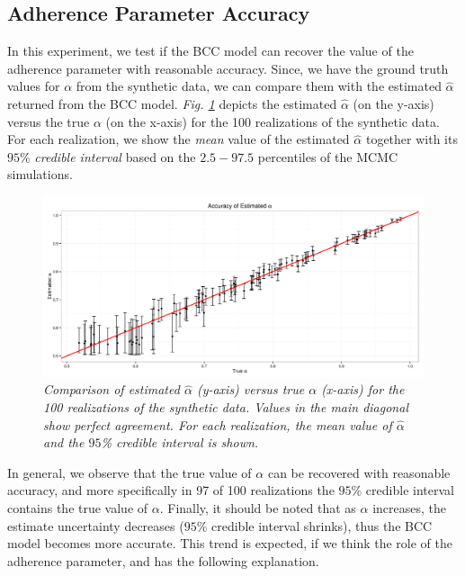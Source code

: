 \subsection{Adherence Parameter Accuracy } \label{integr-synth-alpha-sect}
In this experiment, we test if the BCC model can recover the value of the adherence parameter with reasonable accuracy. Since, we have the ground truth values for $\alpha$ from the synthetic data, we can compare them with the estimated $\hat{\alpha}$ returned from the BCC model. \emph{Fig. \ref{adherence-test-pic}} depicts the estimated $\hat{\alpha}$ (on the y-axis) versus the true $\alpha$ (on the x-axis) for the 100 realizations of the synthetic data. For each realization, we show the \emph{mean} value of the estimated $\hat{\alpha}$ together with its $95$\% \emph{credible interval} based on the $2.5 - 97.5$ percentiles of the MCMC simulations. 
\begin{figure}[!ht]
\begin{center}
 \includegraphics[scale = 0.41]{images/adherenceTest.png}
\caption{\emph{Comparison of estimated $\hat{\alpha}$ (y-axis) versus true $\alpha$ (x-axis) for the 100 realizations of the synthetic data. Values in the main diagonal show perfect agreement. For each realization, the mean value of $\hat{\alpha}$ and the $95$\% credible interval is shown.}}
\label{adherence-test-pic}
\end{center}
\end{figure}

In general, we observe that the true value of $\alpha$ can be recovered with reasonable accuracy, and more specifically in 97 of 100 realizations the $95$\% credible interval contains the true value of $\alpha$. Finally, it should be noted that as $\alpha$ increases, the estimate uncertainty decreases (\ie $95$\% credible interval shrinks), thus the BCC model becomes more accurate. This trend is expected, if we think the role of the adherence parameter, and has the following explanation. 

